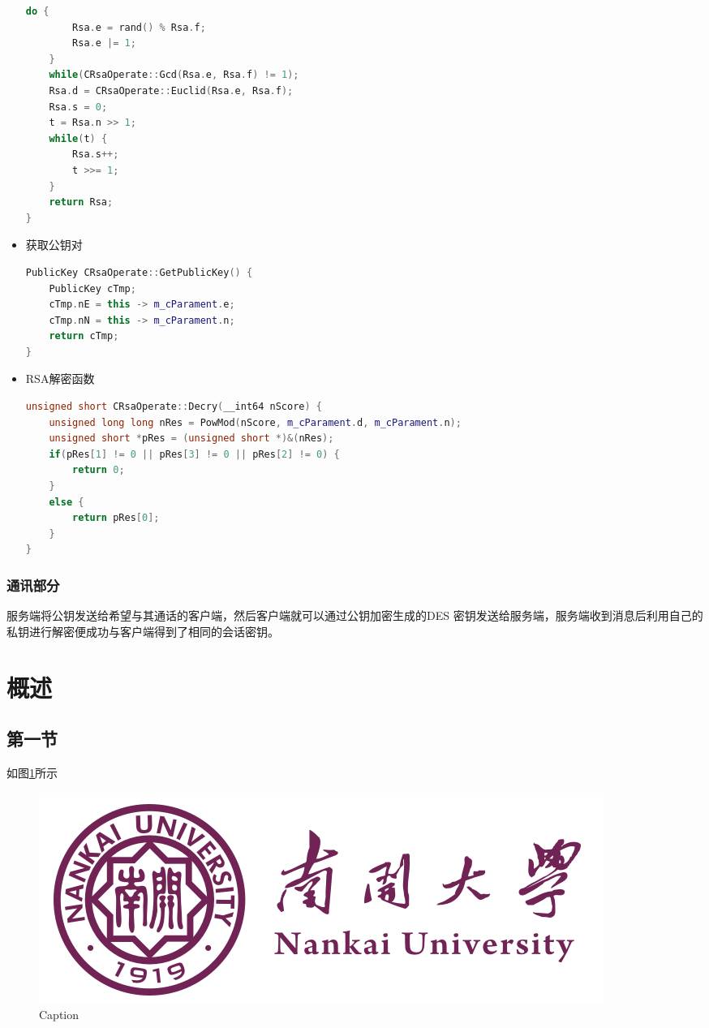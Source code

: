 \documentclass[UTF8,a4paper,10pt]{ctexart}
\begin{document}
\begin{itemize}
\begin{lstlisting}[language = C++]
    do {
        Rsa.e = rand() % Rsa.f;
        Rsa.e |= 1;
    }
    while(CRsaOperate::Gcd(Rsa.e, Rsa.f) != 1);
    Rsa.d = CRsaOperate::Euclid(Rsa.e, Rsa.f);
    Rsa.s = 0;
    t = Rsa.n >> 1;
    while(t) {
        Rsa.s++;
        t >>= 1;
    }
    return Rsa;
}
  \end{lstlisting}
  \item 获取公钥对
  \begin{lstlisting}[language = C++]
PublicKey CRsaOperate::GetPublicKey() {
    PublicKey cTmp;
    cTmp.nE = this -> m_cParament.e;
    cTmp.nN = this -> m_cParament.n;
    return cTmp;
}
  \end{lstlisting}
  \item RSA解密函数
  \begin{lstlisting}[language = C++]
unsigned short CRsaOperate::Decry(__int64 nScore) {
    unsigned long long nRes = PowMod(nScore, m_cParament.d, m_cParament.n);
    unsigned short *pRes = (unsigned short *)&(nRes);
    if(pRes[1] != 0 || pRes[3] != 0 || pRes[2] != 0) {
        return 0;
    }
    else {
        return pRes[0];
    }
}
  \end{lstlisting}
\end{itemize}
\subsubsection{通讯部分}
服务端将公钥发送给希望与其通话的客户端，然后客户端就可以通过公钥加密生成的DES 密钥发送给服务端，服务端收到消息后利用自己的私钥进行解密便成功与客户端得到了相同的会话密钥。





\section{概述}
\subsection{第一节}
如图\ref{fig:1}所示
\begin{figure}[H]
    \centering
    \includegraphics[scale=0.3]{NKU.png}
    \caption{Caption}
    \label{fig:1}
\end{figure}
\end{document}
